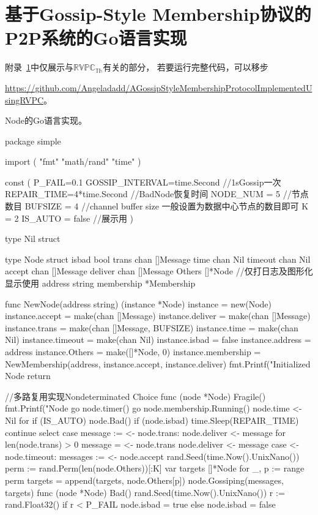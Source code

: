 \chapter{基于Gossip-Style Membership协议的P2P系统的Go语言实现}\label{app:code}
附录~\ref{app:code}中仅展示与$\mathbb{RVPC}_{\mathbb{Th}}$有关的部分，
若要运行完整代码，可以移步

\url{https://github.com/Angeladadd/AGossipStyleMembershipProtocolImplementedUsingRVPC}。

Node的Go语言实现。
\begin{codeblock}[language=GO]
	package simple

	import (
		"fmt"
		"math/rand"
		"time"
	)
	
	const (
		P_FAIL=0.1
		GOSSIP_INTERVAL=time.Second //1sGossip一次
		REPAIR_TIME=4*time.Second //BadNode恢复时间
		NODE_NUM = 5 //节点数目
		BUFSIZE = 4 //channel buffer size 一般设置为数据中心节点的数目即可
		K = 2
		IS_AUTO = false //展示用
	)
	
	type Nil struct {}
	
	type Node struct {
		isbad bool
		trans chan []Message
		time chan Nil
		timeout chan Nil
		accept chan []Message
		deliver chan []Message
		Others []*Node
		//仅打日志及图形化显示使用
		address string
		membership *Membership
	}
	
	func NewNode(address string) (instance *Node) {
		instance = new(Node)
		instance.accept = make(chan []Message)
		instance.deliver = make(chan []Message)
		instance.trans = make(chan []Message, BUFSIZE)
		instance.time = make(chan Nil)
		instance.timeout = make(chan Nil)
		instance.isbad = false
		instance.address = address
		instance.Others = make([]*Node, 0)
		instance.membership = NewMembership(address, instance.accept, instance.deliver)
		fmt.Printf("Initialized Node %
		return
	}
	
	//多路复用实现Nondeterminated Choice
	func (node *Node) Fragile() {
		fmt.Printf("Node %
		go node.timer()
		go node.membership.Running()
		node.time <- Nil{}
		for {
			if (IS_AUTO) {
				node.Bad()
			}
			if (node.isbad) {
				time.Sleep(REPAIR_TIME)
				continue
			}
			select {
			case message := <- node.trans:
				node.deliver <- message
				for len(node.trans) > 0 {
					message = <- node.trans
					node.deliver <- message
				}
			case <- node.timeout:
				messages := <- node.accept
				rand.Seed(time.Now().UnixNano())
				perm := rand.Perm(len(node.Others))[:K]
				var targets []*Node
				for _, p := range perm {
					targets = append(targets, node.Others[p])
				}
				node.Gossiping(messages, targets)
			}
		}
	}
	func (node *Node) Bad() {
		rand.Seed(time.Now().UnixNano())
			r := rand.Float32()
			if r < P_FAIL {
				node.isbad = true
			} else {
				node.isbad = false
			}
	}
	

\end{codeblock}
